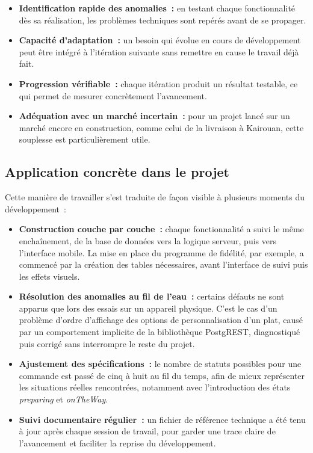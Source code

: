 \documentclass[12pt,fleqn,a4paper]{report}
\begin{document}
\begin{justify}
\begin{itemize}
    \item \textbf{Identification rapide des anomalies~:} en testant chaque fonctionnalité dès sa réalisation, les problèmes techniques sont repérés avant de se propager.
    \item \textbf{Capacité d'adaptation~:} un besoin qui évolue en cours de développement peut être intégré à l'itération suivante sans remettre en cause le travail déjà fait.
    \item \textbf{Progression vérifiable~:} chaque itération produit un résultat testable, ce qui permet de mesurer concrètement l'avancement.
    \item \textbf{Adéquation avec un marché incertain~:} pour un projet lancé sur un marché encore en construction, comme celui de la livraison à Kairouan, cette souplesse est particulièrement utile.
\end{itemize}

\subsection{Application concrète dans le projet}

Cette manière de travailler s'est traduite de façon visible à plusieurs moments du développement~:

\begin{itemize}
    \item \textbf{Construction couche par couche~:} chaque fonctionnalité a suivi le même enchaînement, de la base de données vers la logique serveur, puis vers l'interface mobile. La mise en place du programme de fidélité, par exemple, a commencé par la création des tables nécessaires, avant l'interface de suivi puis les effets visuels.
    \item \textbf{Résolution des anomalies au fil de l'eau~:} certains défauts ne sont apparus que lors des essais sur un appareil physique. C'est le cas d'un problème d'ordre d'affichage des options de personnalisation d'un plat, causé par un comportement implicite de la bibliothèque PostgREST, diagnostiqué puis corrigé sans interrompre le reste du projet.
    \item \textbf{Ajustement des spécifications~:} le nombre de statuts possibles pour une commande est passé de cinq à huit au fil du temps, afin de mieux représenter les situations réelles rencontrées, notamment avec l'introduction des états \textit{preparing} et \textit{onTheWay}.
    \item \textbf{Suivi documentaire régulier~:} un fichier de référence technique a été tenu à jour après chaque session de travail, pour garder une trace claire de l'avancement et faciliter la reprise du développement.
\end{itemize}


\end{justify}
\end{document}
